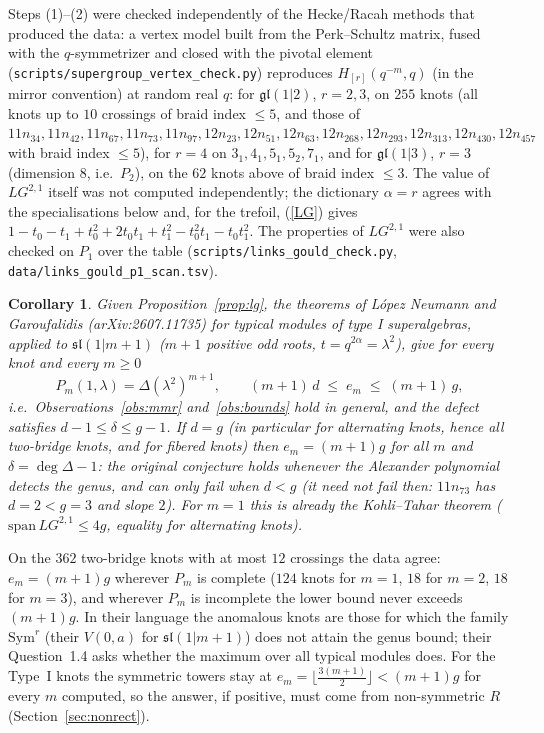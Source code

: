\documentclass[11pt]{article}
\newtheorem{corollary}{Corollary}
\theoremstyle{definition}
\theoremstyle{remark}
\begin{document}
Steps (1)--(2) were checked independently of the Hecke/Racah methods that produced the data: a vertex model
built from the Perk--Schultz matrix, fused with the $q$-symmetrizer and closed with the pivotal element
(\texttt{scripts/supergroup\_vertex\_check.py}) reproduces $H_{[r]}(q^{-m},q)$ (in the mirror convention) at
random real $q$: for $\mathfrak{gl}(1|2)$, $r=2,3$, on $255$ knots (all knots up to $10$ crossings of braid index
$\le5$, and those of $11n_{34},11n_{42},11n_{67},11n_{73},11n_{97},12n_{23},12n_{51},12n_{63},12n_{268},12n_{293},
12n_{313},12n_{430},12n_{457}$ with braid index $\le5$), for $r=4$ on $3_1,4_1,5_1,5_2,7_1$, and for
$\mathfrak{gl}(1|3)$, $r=3$ (dimension $8$, i.e.\ $P_2$), on the $62$ knots above of braid index $\le3$.
The value of $LG^{2,1}$ itself was not computed independently; the dictionary $\alpha=r$ agrees with the
specialisations below and, for the trefoil, (\ref{LG}) gives $1-t_0-t_1+t_0^2+2t_0t_1+t_1^2-t_0^2t_1-t_0t_1^2$.
The properties of $LG^{2,1}$ were also checked on $P_1$ over the table
(\texttt{scripts/links\_gould\_check.py}, \texttt{data/links\_gould\_p1\_scan.tsv}).
\begin{corollary}\label{cor:alt}
Given Proposition~\ref{prop:lg}, the theorems of L\'opez Neumann and Garoufalidis (arXiv:2607.11735) for
typical modules of type I superalgebras, applied to $\mathfrak{sl}(1|m+1)$ ($m+1$ positive odd roots,
$t=q^{2\alpha}=\lambda^2$), give for every knot and every $m\ge0$
\[
  P_m(1,\lambda)=\Delta(\lambda^2)^{m+1},\qquad (m+1)\,d\;\le\;e_m\;\le\;(m+1)\,g ,
\]
i.e.\ Observations~\ref{obs:mmr} and~\ref{obs:bounds} hold in general, and the defect satisfies
$d-1\le\delta\le g-1$.  If $d=g$ (in particular for alternating knots, hence all two-bridge knots, and for fibered
knots) then $e_m=(m+1)g$ for all $m$ and $\delta=\deg\Delta-1$: the original conjecture holds whenever the
Alexander polynomial detects the genus, and can only fail when $d<g$ (it need not fail then: $11n_{73}$ has
$d=2<g=3$ and slope $2$).  For $m=1$ this is
already the Kohli--Tahar theorem ($\mathrm{span}\,LG^{2,1}\le4g$, equality for alternating knots).
\end{corollary}
On the $362$ two-bridge knots with at most $12$ crossings the data agree: $e_m=(m+1)g$ wherever $P_m$ is complete
($124$ knots for $m=1$, $18$ for $m=2$, $18$ for $m=3$), and wherever $P_m$ is incomplete the lower bound never
exceeds $(m+1)g$.  In their language the anomalous knots are those for which the family $\mathrm{Sym}^r$ (their
$V(0,a)$ for $\mathfrak{sl}(1|m+1)$) does not attain the genus bound; their Question~1.4 asks whether the maximum over
all typical modules does.  For the Type~I knots the symmetric towers stay at $e_m=\lfloor\frac{3(m+1)}2\rfloor<(m+1)g$
for every $m$ computed, so the answer, if positive, must come from non-symmetric $R$ (Section~\ref{sec:nonrect}).
\end{document}
